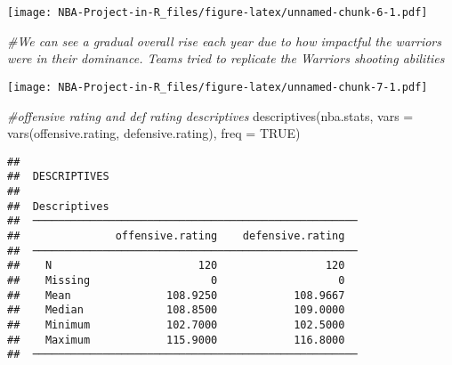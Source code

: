 \documentclass[
]{article}
\newenvironment{Shaded}{\begin{snugshade}}{\end{snugshade}}
\newcommand{\AttributeTok}[1]{\textcolor[rgb]{0.77,0.63,0.00}{#1}}
\newcommand{\CommentTok}[1]{\textcolor[rgb]{0.56,0.35,0.01}{\textit{#1}}}
\newcommand{\ConstantTok}[1]{\textcolor[rgb]{0.00,0.00,0.00}{#1}}
\newcommand{\FloatTok}[1]{\textcolor[rgb]{0.00,0.00,0.81}{#1}}
\newcommand{\FunctionTok}[1]{\textcolor[rgb]{0.00,0.00,0.00}{#1}}
\newcommand{\NormalTok}[1]{#1}
\newcommand{\OtherTok}[1]{\textcolor[rgb]{0.56,0.35,0.01}{#1}}
\newcommand{\SpecialCharTok}[1]{\textcolor[rgb]{0.00,0.00,0.00}{#1}}
\newcommand{\StringTok}[1]{\textcolor[rgb]{0.31,0.60,0.02}{#1}}
\begin{document}
\texttt{[image: NBA-Project-in-R\_files/figure-latex/unnamed-chunk-6-1.pdf]}

\begin{Shaded}
\begin{Highlighting}[]
\CommentTok{\#We can see a gradual overall rise each year due to how impactful the warriors were in their dominance. Teams tried to replicate the Warrior\textquotesingle{}s shooting abilities}
\end{Highlighting}
\end{Shaded}

\begin{Shaded}
\end{Shaded}

\texttt{[image: NBA-Project-in-R\_files/figure-latex/unnamed-chunk-7-1.pdf]}

\begin{Shaded}
\begin{Highlighting}[]
\CommentTok{\#offensive rating and def rating descriptives}
\FunctionTok{descriptives}\NormalTok{(nba.stats, }\AttributeTok{vars =} \FunctionTok{vars}\NormalTok{(offensive.rating, defensive.rating), }\AttributeTok{freq =} \ConstantTok{TRUE}\NormalTok{)}
\end{Highlighting}
\end{Shaded}

\begin{verbatim}
## 
##  DESCRIPTIVES
## 
##  Descriptives                                        
##  ─────────────────────────────────────────────────── 
##               offensive.rating    defensive.rating   
##  ─────────────────────────────────────────────────── 
##    N                       120                 120   
##    Missing                   0                   0   
##    Mean               108.9250            108.9667   
##    Median             108.8500            109.0000   
##    Minimum            102.7000            102.5000   
##    Maximum            115.9000            116.8000   
##  ───────────────────────────────────────────────────
\end{verbatim}
\end{document}
